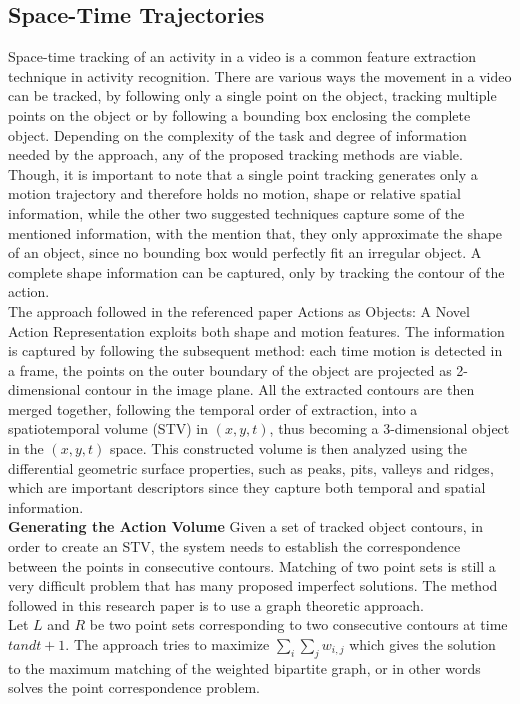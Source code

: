 \documentclass[11pt]{report}
\begin{document}
\subsection{Space-Time Trajectories}
Space-time tracking of an activity in a video is a common feature extraction technique in activity recognition. There are various ways the movement in a video can be tracked, by following only a single point on the object, tracking multiple points on the object or by following a bounding box enclosing the complete object. Depending on the complexity of the task and degree of information needed by the approach, any of the proposed tracking methods are viable. Though, it is important to note that a single point tracking generates only a motion trajectory and therefore holds no motion, shape or relative spatial information, while the other two suggested techniques capture some of the mentioned information, with the mention that, they only approximate the shape of an object, since no bounding box would perfectly fit an irregular object. A complete shape information can be captured, only by tracking the contour of the action. \\
The approach followed in the referenced paper Actions as Objects: A Novel Action Representation \cite{actions-as-objects} exploits both shape and motion features. The information is captured by following the subsequent method: each time motion is detected in a frame, the points on the outer boundary of the object are projected as 2-dimensional contour in the image plane. All the extracted contours are then merged together, following the temporal order of extraction, into a spatiotemporal volume (STV) in \((x,y,t)\), thus becoming a 3-dimensional object in the \((x,y,t)\) space. This constructed volume is then analyzed using the differential geometric surface properties, such as peaks, pits, valleys and ridges, which are important descriptors since they capture both temporal and spatial information. \\

\textbf{Generating the Action Volume}
Given a set of tracked object contours, in order to create an STV, the system needs to establish the correspondence between the points in consecutive contours. Matching of two point sets is still a very difficult problem that has many proposed imperfect solutions. The method followed in this research paper is to use a graph theoretic approach. \\
Let \(L\) and \(R\) be two point sets corresponding to two consecutive contours at time \(t and t+1\). The approach tries to maximize \(\sum_i \sum_j w_{i,j}\) which gives the solution to the maximum matching of the weighted bipartite graph, or in other words solves the point correspondence problem. 
\end{document}
